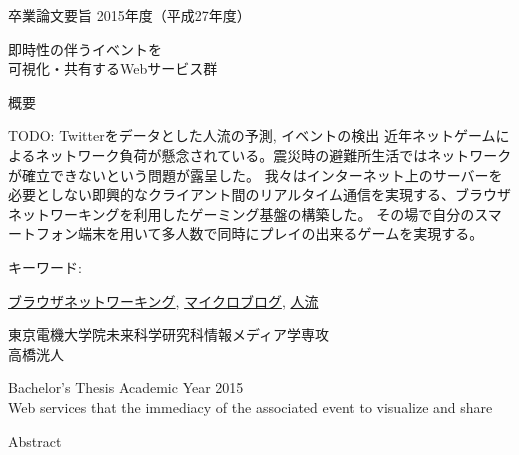 \newpage
\pagestyle{plain}
\begin{center}
\LARGE{卒業論文要旨 \hspace{10mm} 2015年度（平成27年度）}\\

\vspace{10mm}

\LARGE{即時性の伴うイベントを\\可視化・共有するWebサービス群}\\
\end{center}

\begin{center}
概要\\
\end{center}

TODO: Twitterをデータとした人流の予測, イベントの検出
 近年ネットゲームによるネットワーク負荷が懸念されている。震災時の避難所生活ではネットワークが確立できないという問題が露呈した。
我々はインターネット上のサーバーを必要としない即興的なクライアント間のリアルタイム通信を実現する、ブラウザネットワーキングを利用したゲーミング基盤の構築した。
 その場で自分のスマートフォン端末を用いて多人数で同時にプレイの出来るゲームを実現する。

\begin{flushleft}キーワード:\\
\end{flushleft}
{\underline{ブラウザネットワーキング}, \underline{マイクロブログ}, \underline{人流}}


\begin{center}
\vspace{10mm}
\begin{flushright}\large 東京電機大学院未来科学研究科情報メディア学専攻\\
\LARGE 高橋洸人\\
\end{flushright}
\end{center}

\newpage

\begin{center}
\LARGE{Bachelor's Thesis Academic Year 2015}\\

\vspace{10mm}
\LARGE{Web services that the immediacy of the associated event to visualize and share}\\
\end{center}
\begin{center}
Abstract\\
\end{center}


